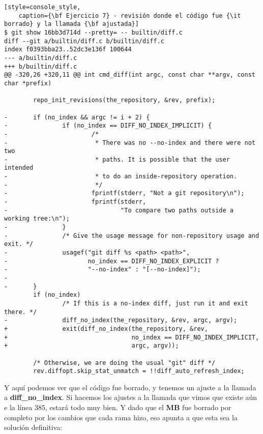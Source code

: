 \begin{lstlisting}[style=console_style,
	caption={\bf Ejercicio 7} - revisión donde el código fue {\it borrado} y la llamada {\bf ajustada}]
$ git show 16bb3d714d --pretty= -- builtin/diff.c
diff --git a/builtin/diff.c b/builtin/diff.c
index f0393bba23..52dc3e136f 100644
--- a/builtin/diff.c
+++ b/builtin/diff.c
@@ -320,26 +320,11 @@ int cmd_diff(int argc, const char **argv, const char *prefix)
 
        repo_init_revisions(the_repository, &rev, prefix);
 
-       if (no_index && argc != i + 2) {
-               if (no_index == DIFF_NO_INDEX_IMPLICIT) {
-                       /*
-                        * There was no --no-index and there were not two
-                        * paths. It is possible that the user intended
-                        * to do an inside-repository operation.
-                        */
-                       fprintf(stderr, "Not a git repository\n");
-                       fprintf(stderr,
-                               "To compare two paths outside a working tree:\n");
-               }
-               /* Give the usage message for non-repository usage and exit. */
-               usagef("git diff %s <path> <path>",
-                      no_index == DIFF_NO_INDEX_EXPLICIT ?
-                      "--no-index" : "[--no-index]");
-
-       }
        if (no_index)
                /* If this is a no-index diff, just run it and exit there. */
-               diff_no_index(the_repository, &rev, argc, argv);
+               exit(diff_no_index(the_repository, &rev,
+                                  no_index == DIFF_NO_INDEX_IMPLICIT,
+                                  argc, argv));
 
        /* Otherwise, we are doing the usual "git" diff */
        rev.diffopt.skip_stat_unmatch = !!diff_auto_refresh_index;
\end{lstlisting}

Y aquí podemos ver que el código fue borrado, y tenemos un ajuste a la llamada a {\bf diff\_no\_index}. Si hacemos los ajustes a la llamada
que vimos que existe aún e la línea 385, estará todo muy bien. Y dado que el {\bf MB} fue borrado por completo por los cambios que
cada rama hizo, eso apunta a que esta sea la solución definitiva:


